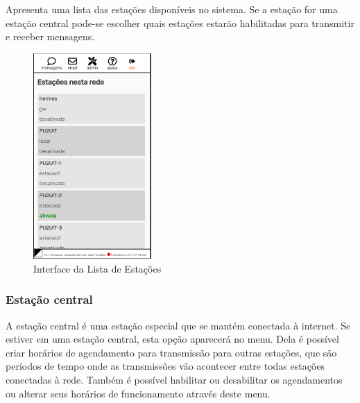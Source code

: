 \documentclass[11pt,a4paper]{article}
\begin{document}
Apresenta uma lista das estações disponíveis no sistema. Se a estação for uma estação central pode-se escolher quais estações estarão habilitadas para transmitir e receber mensagens. 

\begin{figure}[H]
    \centering
    \includegraphics[width=0.4\textwidth]{screenshots/frontend/pt_kn/stations.png}
    \caption{Interface da Lista de Estações}
	\vspace{-10pt}
    \label{fig:stations}
\end{figure} 

\subsubsection{Estação central} 
\label{gui_central_station}

A estação central é uma estação especial que se mantém conectada à internet. Se estiver em uma estação central, esta opção aparecerá no menu. Dela é possível criar horários de agendamento para transmissão para outras estações, que são períodos de tempo onde as transmissões vão acontecer entre todas estações conectadas à rede. Também é possível habilitar ou desabilitar os agendamentos ou alterar seus horários de funcionamento através deste menu.

\end{document}
